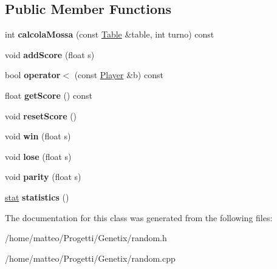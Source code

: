 \subsection*{Public Member Functions}
\begin{DoxyCompactItemize}
\item 
\mbox{\label{classRandom_a08be0305ca661953e40b4241086d71d2}} 
int {\bfseries calcola\+Mossa} (const \hyperlink{classTable}{Table} \&table, int turno) const
\item 
\mbox{\label{classRandom_a0fa90d0e74f9a26548a7311334ccfe1b}} 
void {\bfseries add\+Score} (float s)
\item 
\mbox{\label{classRandom_a154a94c6270445ab9decf58b92f27833}} 
bool {\bfseries operator$<$} (const \hyperlink{classPlayer}{Player} \&b) const
\item 
\mbox{\label{classRandom_a6a114baebd8123b96ae2e65d7d8968e1}} 
float {\bfseries get\+Score} () const
\item 
\mbox{\label{classRandom_ae06770f8ebf06a18e720fa3ee543d8c2}} 
void {\bfseries reset\+Score} ()
\item 
\mbox{\label{classRandom_a2acc914a0a05b81d7d5667c32904e2a3}} 
void {\bfseries win} (float s)
\item 
\mbox{\label{classRandom_a7e4d72b3d70ea87c89a6ecb073e1d476}} 
void {\bfseries lose} (float s)
\item 
\mbox{\label{classRandom_a9c1b5497aed0a505a1bc9e107b557db4}} 
void {\bfseries parity} (float s)
\item 
\mbox{\label{classRandom_a5b70e69373f7fd7fb1f20d37edf51b13}} 
\hyperlink{structstat}{stat} {\bfseries statistics} ()
\end{DoxyCompactItemize}


The documentation for this class was generated from the following files\+:\begin{DoxyCompactItemize}
\item 
/home/matteo/\+Progetti/\+Genetix/random.\+h\item 
/home/matteo/\+Progetti/\+Genetix/random.\+cpp\end{DoxyCompactItemize}
